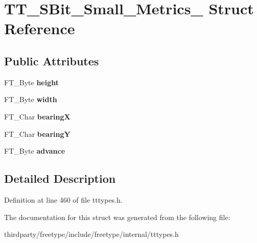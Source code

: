 \hypertarget{struct_t_t___s_bit___small___metrics__}{}\section{T\+T\+\_\+\+S\+Bit\+\_\+\+Small\+\_\+\+Metrics\+\_\+ Struct Reference}
\label{struct_t_t___s_bit___small___metrics__}
\subsection*{Public Attributes}
\begin{DoxyCompactItemize}
\item 
\mbox{\label{struct_t_t___s_bit___small___metrics___aecc44b5e504d5ce27521505ed53420c8}} 
F\+T\+\_\+\+Byte {\bfseries height}
\item 
\mbox{\label{struct_t_t___s_bit___small___metrics___ad2401ae208b1663d0085ca06a04885fe}} 
F\+T\+\_\+\+Byte {\bfseries width}
\item 
\mbox{\label{struct_t_t___s_bit___small___metrics___a4361ae83a66706852c0c7d4c4ddff9c2}} 
F\+T\+\_\+\+Char {\bfseries bearingX}
\item 
\mbox{\label{struct_t_t___s_bit___small___metrics___aba8cbfd6203f4083b8fb305f88d6d1fc}} 
F\+T\+\_\+\+Char {\bfseries bearingY}
\item 
\mbox{\label{struct_t_t___s_bit___small___metrics___a056c5ea71ec3339ca9b7356ea7c90e37}} 
F\+T\+\_\+\+Byte {\bfseries advance}
\end{DoxyCompactItemize}


\subsection{Detailed Description}


Definition at line 460 of file tttypes.\+h.



The documentation for this struct was generated from the following file\+:\begin{DoxyCompactItemize}
\item 
thirdparty/freetype/include/freetype/internal/tttypes.\+h\end{DoxyCompactItemize}
